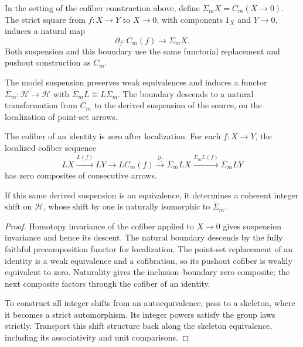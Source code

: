\begin{theorem}
\label{sem:AdamsSynthetic:model-suspension}
\label{sem:AdamsSynthetic:derived-model-suspension}
In the setting of the cofiber construction above, define
$\Sigma_m X=C_m(X\to0)$. The strict square from
$f\colon X\to Y$ to $X\to0$, with components $1_X$ and $Y\to0$,
induces a natural map
\[
 \partial_f\colon C_m(f)\longrightarrow\Sigma_m X.
\]
Both suspension and this boundary use the same functorial replacement
and pushout construction as $C_m$.

The model suspension preserves weak equivalences and induces a functor
$\overline\Sigma_m\colon\mathcal H\to\mathcal H$ with
$\overline\Sigma_m L\cong L\Sigma_m$. The boundary descends to
a natural transformation from $\overline C_m$ to the derived suspension
of the source, on the localization of point-set arrows.

The cofiber of an identity is zero after localization. For each
$f\colon X\to Y$, the localized cofiber sequence
\[
 LX\xrightarrow{L(f)}LY\longrightarrow LC_m(f)
 \xrightarrow{\partial_f}\overline\Sigma_m LX
 \xrightarrow{\overline\Sigma_m L(f)}\overline\Sigma_m LY
\]
has zero composites of consecutive arrows.

If this same derived suspension is an equivalence, it determines a
coherent integer shift on $\mathcal H$, whose shift by one is naturally
isomorphic to $\overline\Sigma_m$.
\end{theorem}
\begin{proof}
Homotopy invariance of the cofiber applied to $X\to0$ gives suspension
invariance and hence its descent. The natural boundary descends by
the fully faithful precomposition functor for localization.
The point-set replacement of an identity is a weak equivalence and
a cofibration, so its pushout cofiber is weakly equivalent to zero.
Naturality gives the inclusion--boundary zero composite; the next
composite factors through the cofiber of an identity.

To construct all integer shifts from an autoequivalence, pass to a
skeleton, where it becomes a strict automorphism. Its integer powers
satisfy the group laws strictly. Transport this shift structure back
along the skeleton equivalence, including its associativity and unit
comparisons.
\end{proof}

